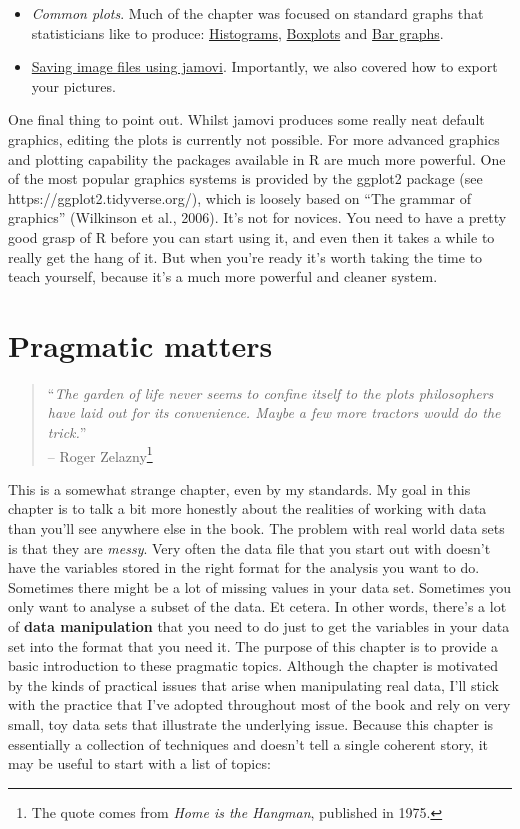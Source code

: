 \documentclass[
  a4paper,
]{book}
\providecommand{\tightlist}{%
  \setlength{\itemsep}{0pt}\setlength{\parskip}{0pt}}\usepackage{longtable,booktabs,array}
\begin{document}
\begin{itemize}
\tightlist
\item
  \emph{Common plots}. Much of the chapter was focused on standard
  graphs that statisticians like to produce:
  \protect\hyperlink{sec-Histograms}{Histograms},
  \protect\hyperlink{boxplots}{Boxplots} and
  \protect\hyperlink{sec-Bar-graphs}{Bar graphs}.
\item
  \protect\hyperlink{saving-image-files-using-jamovi}{Saving image files
  using jamovi}. Importantly, we also covered how to export your
  pictures.
\end{itemize}

One final thing to point out. Whilst jamovi produces some really neat
default graphics, editing the plots is currently not possible. For more
advanced graphics and plotting capability the packages available in R
are much more powerful. One of the most popular graphics systems is
provided by the ggplot2 package (see https://ggplot2.tidyverse.org/),
which is loosely based on ``The grammar of graphics'' (Wilkinson et al.,
2006). It's not for novices. You need to have a pretty good grasp of R
before you can start using it, and even then it takes a while to really
get the hang of it. But when you're ready it's worth taking the time to
teach yourself, because it's a much more powerful and cleaner system.

\hypertarget{sec-Pragmatic-matters}{%
\chapter{Pragmatic matters}\label{sec-Pragmatic-matters}}

\begin{quote}
``\emph{The garden of life never seems to confine itself to the plots
philosophers have laid out for its convenience. Maybe a few more
tractors would do the trick.}''\\
-- Roger Zelazny\footnote{The quote comes from \emph{Home is the
  Hangman}, published in 1975.}
\end{quote}

This is a somewhat strange chapter, even by my standards. My goal in
this chapter is to talk a bit more honestly about the realities of
working with data than you'll see anywhere else in the book. The problem
with real world data sets is that they are \emph{messy}. Very often the
data file that you start out with doesn't have the variables stored in
the right format for the analysis you want to do. Sometimes there might
be a lot of missing values in your data set. Sometimes you only want to
analyse a subset of the data. Et cetera. In other words, there's a lot
of \textbf{data manipulation} that you need to do just to get the
variables in your data set into the format that you need it. The purpose
of this chapter is to provide a basic introduction to these pragmatic
topics. Although the chapter is motivated by the kinds of practical
issues that arise when manipulating real data, I'll stick with the
practice that I've adopted throughout most of the book and rely on very
small, toy data sets that illustrate the underlying issue. Because this
chapter is essentially a collection of techniques and doesn't tell a
single coherent story, it may be useful to start with a list of topics:
\end{document}
